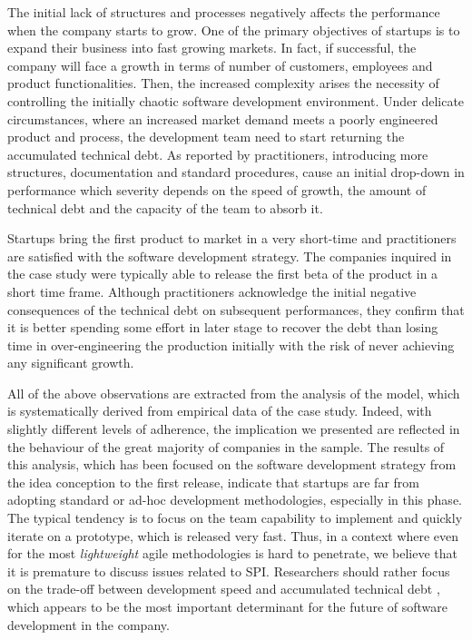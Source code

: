 \documentclass[10pt,journal,letterpaper,compsoc]{IEEEtran}
\begin{document}
\begin{compactitem}
\item The initial lack of structures and processes negatively affects the 
performance when the company starts to grow. One of the primary objectives of 
startups is to expand their business into fast growing markets. In fact, if 
successful, the company will face a growth in terms of number of customers, 
employees and product functionalities. Then, the increased complexity arises the 
necessity of controlling the initially chaotic software development environment. 
Under delicate circumstances, where an increased market demand meets a poorly 
engineered product and process,  the development team need to start returning 
the accumulated technical debt. As reported by practitioners, introducing more 
structures, documentation and standard procedures, cause an initial drop-down in 
performance which severity depends on the speed of growth, the amount of 
technical debt and the capacity of the team to absorb it. 

\item Startups bring the first product to market in a very short-time and 
practitioners are satisfied with the software development strategy. The 
companies inquired in the case study were typically able to release the first 
beta of the product in a short time frame. Although practitioners acknowledge 
the initial negative consequences of the technical debt on subsequent 
performances, they confirm that it is better spending some effort in later stage 
to recover the debt than losing time in over-engineering the production 
initially with the risk of never achieving any significant growth. 
\end{compactitem}


All of the above observations are extracted from the analysis of the model, 
which is systematically derived from empirical data of the case study. Indeed, 
with slightly different levels of adherence, the implication we presented are 
reflected in the behaviour of the great majority of companies in the sample. The 
results of this analysis, which has been focused on the software development 
strategy from the idea conception to the first release, indicate that startups 
are far from adopting standard or ad-hoc development methodologies, especially 
in this phase. The typical tendency is to focus on the team capability to 
implement and quickly iterate on a prototype, which is released very fast. Thus, 
in a context where even for the most \textit{lightweight} agile methodologies is 
hard to penetrate, we believe that it is premature to discuss issues related to 
SPI. Researchers should rather focus on the trade-off between development speed 
and accumulated technical debt \cite{Brown:2010:MTD:1882362.1882373}, which 
appears to be the most important determinant for the future of 
software development in the company.
\end{document}
